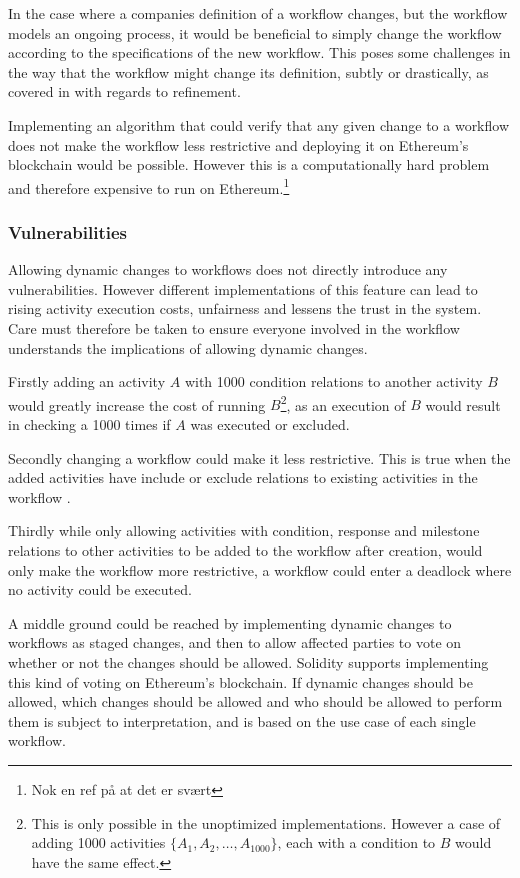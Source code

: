 \documentclass{article}
\begin{document}
		In the case where a companies definition of a workflow changes, but the workflow models an ongoing process, it would be beneficial to simply change the workflow according to the specifications of the new workflow.
		This poses some challenges in the way that the workflow might change its definition, subtly or drastically, as covered in \cite{hierarchical-declarative-modelling} with regards to refinement.
		
		Implementing an algorithm that could verify that any given change to a workflow does not make the workflow less restrictive and deploying it on Ethereum's blockchain would be possible.
		However this is a computationally hard problem and therefore expensive to run on Ethereum.\footnote{Nok en ref på at det er svært}

			\subsubsection{Vulnerabilities}
			Allowing dynamic changes to workflows does not directly introduce any vulnerabilities. 
			However different implementations of this feature can lead to rising activity execution costs, unfairness and lessens the trust in the system. 
			Care must therefore be taken to ensure everyone involved in the workflow understands the implications of allowing dynamic changes.

			Firstly adding an activity $A$ with 1000 condition relations to another activity $B$ would greatly increase the cost of running $B$\footnote{This is only possible in the unoptimized implementations. However a case of adding 1000 activities $\{A_1, A_2, \dots, A_{1000}\}$, each with a condition to $B$ would have the same effect.}, as an execution of $B$ would result in checking a 1000 times if $A$ was executed or excluded. 

			Secondly changing a workflow could make it less restrictive. 
			This is true when the added activities have include or exclude relations to existing activities in the workflow \cite{dynamic-workflows}.

			Thirdly while only allowing activities with condition, response and milestone relations to other activities to be added to the workflow after creation, would only make the workflow more restrictive, a workflow could enter a deadlock where no activity could be executed.

			A middle ground could be reached by implementing dynamic changes to workflows as staged changes, and then to allow affected parties to vote on whether or not the changes should be allowed.
			Solidity supports implementing this kind of voting on Ethereum's blockchain.\cite{voting} 
			If dynamic changes should be allowed, which changes should be allowed and who should be allowed to perform them is subject to interpretation, and is based on the use case of each single workflow.
\end{document}
